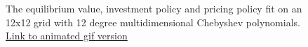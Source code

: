 \documentclass[12pt]{article}
\begin{document}
\begin{figure}[H]
  \centering
  \caption{The equilibrium value, investment policy and pricing policy fit on an 12x12 grid with 12 degree multidimensional Chebyshev polynomials. \href{https://github.com/wmjones/VFA-for-dynamic-games/blob/master/gif_cai_12_12.gif}{Link to animated gif version}}
  \label{gibbslittle}
\end{figure}
\end{document}
